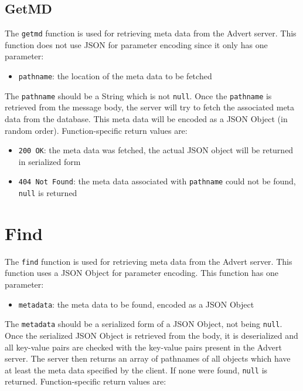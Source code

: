 \documentclass[a4paper,10pt]{article}
\begin{document}
\subsection{GetMD}
\label{getmd}
The \texttt{getmd} function is used for retrieving meta data from the Advert
server. This function does not use JSON for parameter encoding since it only has
one
parameter:

\begin{itemize}
  \item \texttt{pathname}: the location of the meta data to be fetched
\end{itemize}

The \texttt{pathname} should be a String which is not \texttt{null}. Once the
\texttt{pathname} is retrieved from the message body, the server will try to
fetch the associated meta data from the database. This meta data will be
encoded as a JSON Object (in random order). Function-specific return values are:

\begin{itemize}
  \item \texttt{200 OK}: the meta data was fetched, the actual JSON object will
  be returned in serialized form
  \item \texttt{404 Not Found}: the meta data associated with \texttt{pathname}
  could not be found, \texttt{null} is returned
\end{itemize}

\section{Find}
\label{find}
The \texttt{find} function is used for retrieving meta data from the Advert
server. This function uses a JSON Object for parameter encoding. This function
has one parameter:

\begin{itemize}
  \item \texttt{metadata}: the meta data to be found, encoded as a JSON Object
\end{itemize}

The \texttt{metadata} should be a serialized form of a JSON Object, not being
\texttt{null}. Once the serialized JSON Object is retrieved from the body, it
is deserialized and all key-value pairs are checked with the key-value pairs
present in the Advert server. The server then returns an array of
pathnames of all objects which have at least the meta data specified by the
client. If none were found, \texttt{null} is returned. Function-specific return
values are:
\end{document}
